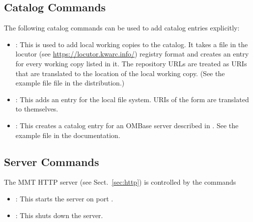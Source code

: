 \subsection{Catalog Commands}\label{sec:shell:catalog}
The following catalog commands can be used to add catalog entries explicitly:

\begin{itemize}
\item {}: This is used to add local working copies to the catalog. It takes a file  in the locutor (see \url{https://locutor.kwarc.info/})  registry format and creates an entry for every working copy listed in it. The repository URLs are treated as URIs that are translated to the location of the local working copy. (See the example file  file in the distribution.)
\item {}: This adds an entry for the local file system. URIs of the form  are translated to themselves.
\item {}: This creates a catalog entry for an OMBase server described in . See the example file  in the documentation.
\end{itemize}

\subsection{Server Commands}\label{sec:shell:server}
The MMT HTTP server (see Sect.~\ref{sec:http}) is controlled by the commands
\begin{itemize}
\item {}: This starts the server on port .
\item {}: This shuts down the server.
\end{itemize}